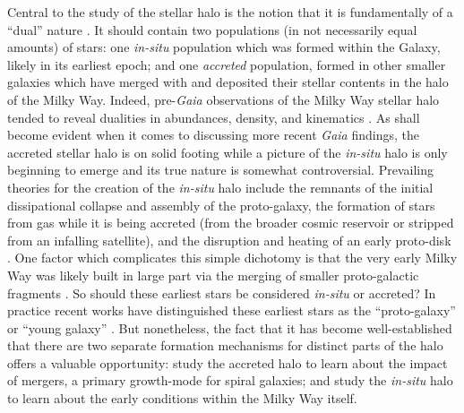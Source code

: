 Central to the study of the stellar halo is the notion that it is fundamentally of a ``dual'' nature \parencite{norris94,zolotov09}. It should contain two populations (in not necessarily equal amounts) of stars: one \textit{in-situ} population which was formed within the Galaxy, likely in its earliest epoch; and one \textit{accreted} population, formed in other smaller galaxies which have merged with and deposited their stellar contents in the halo of the Milky Way. Indeed, pre-\textit{Gaia} observations of the Milky Way stellar halo tended to reveal dualities in abundances, density, and kinematics \parencite[e.g.][]{kinman94,carollo07,nissen10,deason11}. As shall become evident when it comes to discussing more recent \textit{Gaia} findings, the accreted stellar halo is on solid footing while a picture of the \textit{in-situ} halo is only beginning to emerge and its true nature is somewhat controversial. Prevailing theories for the creation of the \textit{in-situ} halo include the remnants of the initial dissipational collapse and assembly of the proto-galaxy, the formation of stars from gas while it is being accreted (from the broader cosmic reservoir or stripped from an infalling satellite), and the disruption and heating of an early proto-disk \parencite{zolotov09,purcell10,font11,tissera13,cooper15}. One factor which complicates this simple dichotomy is that the very early Milky Way was likely built in large part via the merging of smaller proto-galactic fragments \parencite[i.e. within the standard galaxy formation frameworks of ][]{white78,white91}. So should these earliest stars be considered \textit{in-situ} or accreted? In practice recent works have distinguished these earliest stars as the ``proto-galaxy'' or ``young galaxy'' \parencite[e.g.][]{conroy22,belokurov22}. But nonetheless, the fact that it has become well-established that there are two separate formation mechanisms for distinct parts of the halo offers a valuable opportunity: study the accreted halo to learn about the impact of mergers, a primary growth-mode for spiral galaxies; and study the \textit{in-situ} halo to learn about the early conditions within the Milky Way itself.

